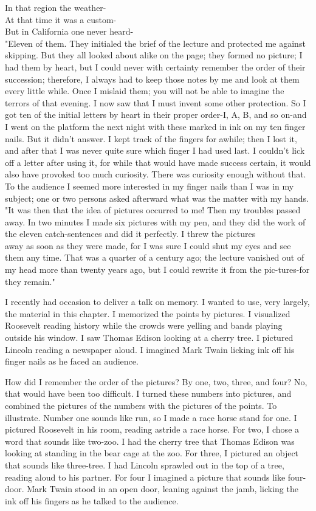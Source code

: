 \documentclass[10pt]{article}
\begin{document}
In that region the weather-\\
At that time it was a custom-\\
But in California one never heard-\\
"Eleven of them. They initialed the brief of the lecture and protected me against skipping. But they all looked about alike on the page; they formed no picture; I had them by heart, but I could never with certainty remember the order of their succession; therefore, I always had to keep those notes by me and look at them every little while. Once I mislaid them; you will not be able to imagine the terrors of that evening. I now saw that I must invent some other protection. So I got ten of the initial letters by heart in their proper order-I, A, B, and so on-and I went on the platform the next night with these marked in ink on my ten finger nails. But it didn't answer. I kept track of the fingers for awhile; then I lost it, and after that I was never quite sure which finger I had used last. I couldn't lick off a letter after using it, for while that would have made success certain, it would also have provoked too much curiosity. There was curiosity enough without that. To the audience I seemed more interested in my finger nails than I was in my subject; one or two persons asked afterward what was the matter with my hands.\\
"It was then that the idea of pictures occurred to me! Then my troubles passed away. In two minutes I made six pictures with my pen, and they did the work of the eleven catch-sentences and did it perfectly. I threw the pictures\\
away as soon as they were made, for I was sure I could shut my eyes and see them any time. That was a quarter of a century ago; the lecture vanished out of my head more than twenty years ago, but I could rewrite it from the pic-tures-for they remain."

I recently had occasion to deliver a talk on memory. I wanted to use, very largely, the material in this chapter. I memorized the points by pictures. I visualized Roosevelt reading history while the crowds were yelling and bands playing outside his window. I saw Thomas Edison looking at a cherry tree. I pictured Lincoln reading a newspaper aloud. I imagined Mark Twain licking ink off his finger nails as he faced an audience.

How did I remember the order of the pictures? By one, two, three, and four? No, that would have been too difficult. I turned these numbers into pictures, and combined the pictures of the numbers with the pictures of the points. To illustrate. Number one sounds like run, so I made a race horse stand for one. I pictured Roosevelt in his room, reading astride a race horse. For two, I chose a word that sounds like two-zoo. I had the cherry tree that Thomas Edison was looking at standing in the bear cage at the zoo. For three, I pictured an object that sounds like three-tree. I had Lincoln sprawled out in the top of a tree, reading aloud to his partner. For four I imagined a picture that sounds like four-door. Mark Twain stood in an open door, leaning against the jamb, licking the ink off his fingers as he talked to the audience.
\end{document}
